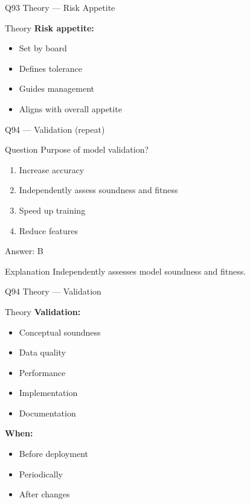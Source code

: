 \documentclass[aspectratio=169,8pt]{beamer}
\begin{document}
	\begin{frame}{Q93 Theory --- Risk Appetite}
		\begin{block}{Theory}
			\textbf{Risk appetite:}
			\begin{itemize}
				\item Set by board
				\item Defines tolerance
				\item Guides management
				\item Aligns with overall appetite
			\end{itemize}
		\end{block}
	\end{frame}
	
	\begin{frame}{Q94 --- Validation (repeat)}
		\begin{block}{Question}
			Purpose of model validation?
		\end{block}
		\begin{enumerate}[label=\Alph*.]
			\item Increase accuracy
			\item Independently assess soundness and fitness
			\item Speed up training
			\item Reduce features
		\end{enumerate}
		\begin{exampleblock}{Answer: B}
		\end{exampleblock}
		\begin{block}{Explanation}
			Independently assesses model soundness and fitness.
		\end{block}
	\end{frame}
	
	\begin{frame}{Q94 Theory --- Validation}
		\begin{block}{Theory}
			\textbf{Validation:}
			\begin{itemize}
				\item Conceptual soundness
				\item Data quality
				\item Performance
				\item Implementation
				\item Documentation
			\end{itemize}
			\textbf{When:}
			\begin{itemize}
				\item Before deployment
				\item Periodically
				\item After changes
			\end{itemize}
		\end{block}
	\end{frame}
	
\end{document}
